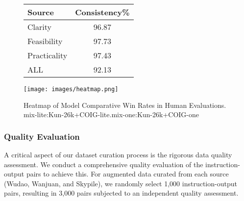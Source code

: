 \begin{figure}[htbp]
  \centering

  \begin{minipage}{0.4\textwidth}
    \centering
    \begin{tabular}{lc}
      \toprule[1pt] 
      \textbf{Source} & \textbf{Consistency\%} \\
      \midrule[1pt] 
      Clarity         & 96.87 \\
      Feasibility     & 97.73 \\
      Practicality    & 97.43 \\
      \midrule 
      ALL             & 92.13 \\
      \bottomrule[1pt]
    \end{tabular}
    \label{tab:Consistency}
  \end{minipage}
  \hfill
  \begin{minipage}{0.50\textwidth}
    \centering
    \texttt{[image: images/heatmap.png]}
    \caption{Heatmap of Model Comparative Win Rates in Human Evaluations. mix-lite:Kun-26k+COIG-lite.mix-one:Kun-26k+COIG-one}
    \label{fig:heatmap}
  \end{minipage}
  \vspace{-0.5cm}
\end{figure}

\subsubsection{Quality Evaluation}
\label{sec: data evaluation}

A critical aspect of our dataset curation process is the rigorous data quality assessment. We conduct a comprehensive quality evaluation of the instruction-output pairs to achieve this. For augmented data curated from each source (Wudao, Wanjuan, and Skypile), we randomly select 1,000 instruction-output pairs, resulting in 3,000 pairs subjected to an independent quality assessment. 

